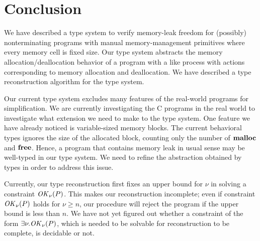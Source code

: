 \section{Conclusion}\label{sec:conclusion}

We have described a type system to verify memory-leak freedom for
(possibly) nonterminating programs with manual memory-management
primitives where every memory cell is fixed size.  Our type system
abstracts the memory allocation/deallocation behavior of a program
with a like process with actions corresponding to memory allocation
and deallocation.  We have described a type reconstruction algorithm
for the type system.

Our current type system excludes many features of the real-world
programs for simplification.  We are currently investigating the C
programs in the real world to investigate what extension we need to
make to the type system.  One feature we have already noticed is
variable-sized memory blocks.  The current behavioral types ignores
the size of the allocated block, counting only the number of
\(\mathbf{malloc}\) and \(\mathbf{free}\).  Hence, a program that contains memory leak
in usual sense may be well-typed in our type system.  We need to
refine the abstraction obtained by types in order to address this
issue.

Currently, our type reconstruction first fixes an upper bound for
\(\nu\) in solving a constraint \(\mathit{OK}_\nu(P)\).  This makes our
reconstruction incomplete; even if constraint \(\mathit{OK}_\nu(P)\) holds for
\(\nu \ge n\), our procedure will reject the program if the upper
bound is less than \(n\).  We have not yet figured out whether a
constraint of the form \(\exists \nu. \mathit{OK}_\nu(P)\), which is needed to
be solvable for reconstruction to be complete, is decidable or not.

